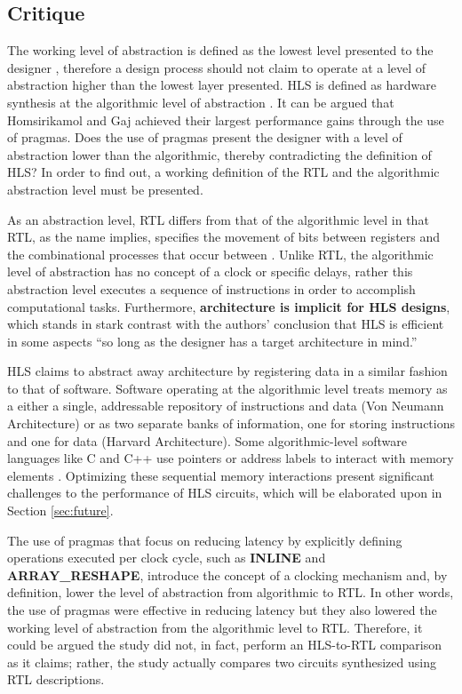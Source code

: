 \documentclass[12pt,journal,compsoc,onecolumn]{IEEEtran}
\begin{document}
\subsection{Critique}
The working level of abstraction is defined as the lowest level presented to the designer \cite{Harris+Harris}, therefore a design process should not claim to operate at a level of abstraction higher than the lowest layer presented. HLS is defined as hardware synthesis at the algorithmic level of abstraction \cite{3}\cite{4}. It can be argued that Homsirikamol and Gaj achieved their largest performance gains through the use of pragmas. Does the use of pragmas present the designer with a level of abstraction lower than the algorithmic, thereby contradicting the definition of HLS? In order to find out, a working definition of the RTL and the algorithmic abstraction level must be presented.

As an abstraction level, RTL differs from that of the algorithmic level in that RTL, as the name implies, specifies the movement of bits between registers and the combinational processes that occur between \cite{churtl}. Unlike RTL, the algorithmic level of abstraction has no concept of a clock or specific delays, rather this abstraction level executes a sequence of instructions in order to accomplish computational tasks\cite{churtl}. Furthermore, \textbf{architecture is implicit for HLS designs}\cite{bsv}, which stands in stark contrast with the authors' conclusion that HLS is efficient in some aspects ``so long as the designer has a target architecture in mind.'' 

HLS claims to abstract away architecture by registering data in a similar fashion to that of software\cite{legup}. Software operating at the algorithmic level treats memory as a either a single, addressable repository of instructions and data (Von Neumann Architecture) or as two separate banks of information, one for storing instructions and one for data (Harvard Architecture). Some algorithmic-level software languages like C and C++ use pointers or address labels to interact with memory elements \cite{cpointers}. Optimizing these sequential memory interactions present significant challenges to the performance of HLS circuits, which will be elaborated upon in Section \ref{sec:future}.

The use of pragmas that focus on reducing latency by explicitly defining operations executed per clock cycle, such as \textbf{INLINE} and \textbf{ARRAY\_RESHAPE}, introduce the concept of a clocking mechanism and, by definition, lower the level of abstraction from algorithmic to RTL. In other words, the use of pragmas were effective in reducing latency but they also lowered the working level of abstraction from the algorithmic level to RTL. Therefore, it could be argued the study did not, in fact, perform an HLS-to-RTL comparison as it claims; rather, the study actually compares two circuits synthesized using RTL descriptions. 
\end{document}
